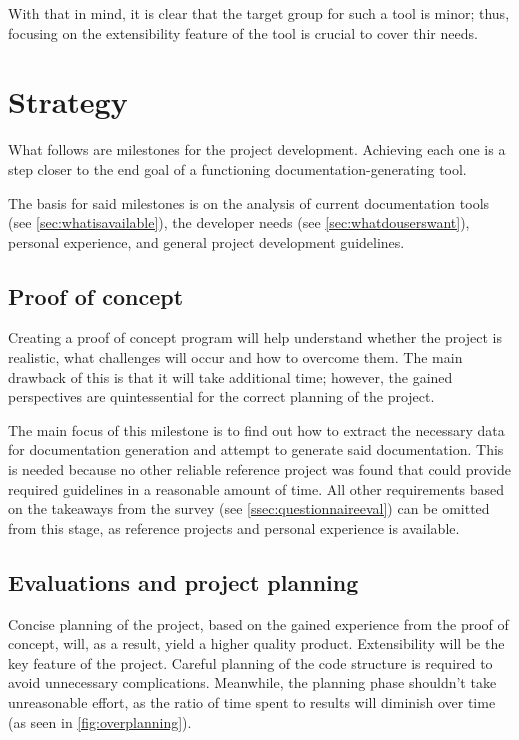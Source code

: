 With that in mind, it is clear that the target group for such a tool is minor; thus, focusing on the extensibility feature of the tool is crucial to cover thir needs.

\section*{Strategy}

What follows are milestones for the project development.
Achieving each one is a step closer to the end goal of a functioning documentation-generating tool.

The basis for said milestones is on the analysis of current documentation tools (see \ref{sec:whatisavailable}), the developer needs (see \ref{sec:whatdouserswant}), personal experience, and general project development guidelines.

\subsection*{Proof of concept} \label{subSecProofOfConcept}

Creating a proof of concept program will help understand whether the project is realistic, what challenges will occur and how to overcome them.
The main drawback of this is that it will take additional time; however, the gained perspectives are quintessential for the correct planning of the project.

The main focus of this milestone is to find out how to extract the necessary data for documentation generation and attempt to generate said documentation.
This is needed because no other reliable reference project was found that could provide required guidelines in a reasonable amount of time.
All other requirements based on the takeaways from the survey (see \ref{ssec:questionnaireeval}) can be omitted from this stage, as reference projects and personal experience is available.

\subsection*{Evaluations and project planning} \label{subSecEvalProjPlanning}

Concise planning of the project, based on the gained experience from the proof of concept, will, as a result, yield a higher quality product.
Extensibility will be the key feature of the project. Careful planning of the code structure is required to avoid unnecessary complications.
Meanwhile, the planning phase shouldn't take unreasonable effort, as the ratio of time spent to results will diminish over time (as seen in \ref{fig:overplanning}). \cite{ruparelia_stop_2016}

